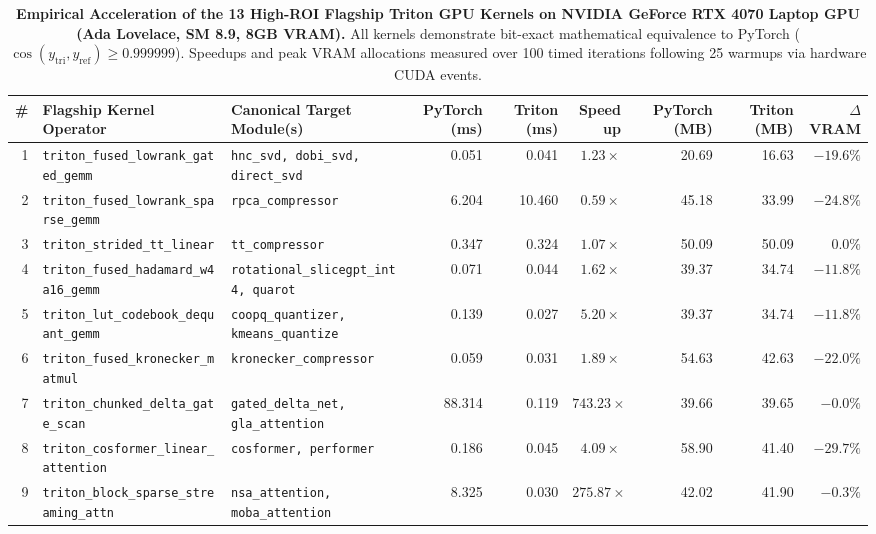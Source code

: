 \begin{table}[t]
\centering
\caption{\textbf{Empirical Acceleration of the 13 High-ROI Flagship Triton GPU Kernels on NVIDIA GeForce RTX 4070 Laptop GPU (Ada Lovelace, SM 8.9, 8GB VRAM).}
All kernels demonstrate bit-exact mathematical equivalence to PyTorch ($\cos(y_{\text{tri}}, y_{\text{ref}}) \ge 0.999999$). Speedups and peak VRAM allocations measured over 100 timed iterations following 25 warmups via hardware CUDA events.}
\label{tab:flagship_triton_kernels}
\scriptsize
\setlength{\tabcolsep}{3.5pt}
\begin{tabular}{rllrrrrrr}
\toprule
\textbf{\#} & \textbf{Flagship Kernel Operator} & \textbf{Canonical Target Module(s)} & \textbf{PyTorch (ms)} & \textbf{Triton (ms)} & \textbf{Speedup} & \textbf{PyTorch (MB)} & \textbf{Triton (MB)} & \textbf{$\Delta$VRAM} \\
\midrule
1 & \texttt{triton\_fused\_lowrank\_gated\_gemm} & \texttt{hnc\_svd, dobi\_svd, direct\_svd} & 0.051 & 0.041 & $\mathbf{1.23\times}$ & 20.69 & 16.63 & $\mathbf{-19.6\%}$ \\
2 & \texttt{triton\_fused\_lowrank\_sparse\_gemm} & \texttt{rpca\_compressor} & 6.204 & 10.460 & $0.59\times$ & 45.18 & 33.99 & $\mathbf{-24.8\%}$ \\
3 & \texttt{triton\_strided\_tt\_linear} & \texttt{tt\_compressor} & 0.347 & 0.324 & $\mathbf{1.07\times}$ & 50.09 & 50.09 & $0.0\%$ \\
4 & \texttt{triton\_fused\_hadamard\_w4a16\_gemm} & \texttt{rotational\_slicegpt\_int4, quarot} & 0.071 & 0.044 & $\mathbf{1.62\times}$ & 39.37 & 34.74 & $\mathbf{-11.8\%}$ \\
5 & \texttt{triton\_lut\_codebook\_dequant\_gemm} & \texttt{coopq\_quantizer, kmeans\_quantize} & 0.139 & 0.027 & $\mathbf{5.20\times}$ & 39.37 & 34.74 & $\mathbf{-11.8\%}$ \\
6 & \texttt{triton\_fused\_kronecker\_matmul} & \texttt{kronecker\_compressor} & 0.059 & 0.031 & $\mathbf{1.89\times}$ & 54.63 & 42.63 & $\mathbf{-22.0\%}$ \\
7 & \texttt{triton\_chunked\_delta\_gate\_scan} & \texttt{gated\_delta\_net, gla\_attention} & 88.314 & 0.119 & $\mathbf{743.23\times}$ & 39.66 & 39.65 & $-0.0\%$ \\
8 & \texttt{triton\_cosformer\_linear\_attention} & \texttt{cosformer, performer} & 0.186 & 0.045 & $\mathbf{4.09\times}$ & 58.90 & 41.40 & $\mathbf{-29.7\%}$ \\
9 & \texttt{triton\_block\_sparse\_streaming\_attn} & \texttt{nsa\_attention, moba\_attention} & 8.325 & 0.030 & $\mathbf{275.87\times}$ & 42.02 & 41.90 & $-0.3\%$ \\

\end{tabular}
\end{table}

